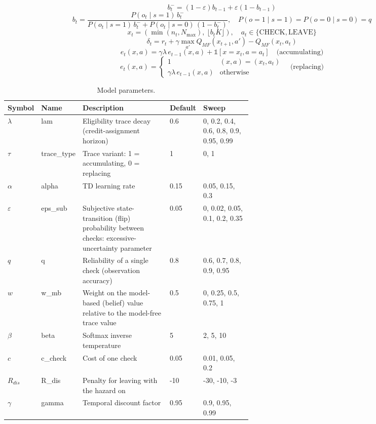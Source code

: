 \documentclass[11pt,a4paper]{article}
\begin{document}
\begin{equation}\label{eq:1}
b_t^{-} = (1-\varepsilon) b_{t-1} + \varepsilon (1 - b_{t-1})
\end{equation}
\begin{equation}\label{eq:2}
b_t = \frac{P(o_t \mid s=1)\, b_t^{-}}{P(o_t \mid s=1)\, b_t^{-} + P(o_t \mid s=0)\,(1-b_t^{-})}, \quad P(o=1 \mid s=1) = P(o=0 \mid s=0) = q
\end{equation}
\begin{equation}\label{eq:3}
x_t = (\min(n_t, N_{\max}),\ \lfloor b_t K \rfloor), \quad a_t \in \{\mathrm{CHECK}, \mathrm{LEAVE}\}
\end{equation}
\begin{equation}\label{eq:4}
\delta_t = r_t + \gamma \max_{a'} Q_{MF}(x_{t+1}, a') - Q_{MF}(x_t, a_t)
\end{equation}
\begin{equation}\label{eq:5}
e_t(x,a) = \gamma \lambda\, e_{t-1}(x,a) + \mathbb{1}[x = x_t, a = a_t] \quad \text{(accumulating)}
\end{equation}
\begin{equation}\label{eq:6}
e_t(x,a) = \begin{cases} 1 & (x,a) = (x_t,a_t) \\ \gamma \lambda\, e_{t-1}(x,a) & \text{otherwise} \end{cases} \quad \text{(replacing)}
\end{equation}
\begin{table}[ht]
\centering\small
\caption{Model parameters.}\label{tab:params}
\begin{tabular}{l l p{0.36\linewidth} l p{0.2\linewidth}}
\toprule
Symbol & Name & Description & Default & Sweep\\
\midrule
$\lambda$ & lam & Eligibility trace decay (credit-assignment horizon) & 0.6 & 0, 0.2, 0.4, 0.6, 0.8, 0.9, 0.95, 0.99\\
$\tau$ & trace\_type & Trace variant: 1 = accumulating, 0 = replacing & 1 & 0, 1\\
$\alpha$ & alpha & TD learning rate & 0.15 & 0.05, 0.15, 0.3\\
$\varepsilon$ & eps\_sub & Subjective state-transition (flip) probability between checks: excessive-uncertainty parameter & 0.05 & 0, 0.02, 0.05, 0.1, 0.2, 0.35\\
$q$ & q & Reliability of a single check (observation accuracy) & 0.8 & 0.6, 0.7, 0.8, 0.9, 0.95\\
$w$ & w\_mb & Weight on the model-based (belief) value relative to the model-free trace value & 0.5 & 0, 0.25, 0.5, 0.75, 1\\
$\beta$ & beta & Softmax inverse temperature & 5 & 2, 5, 10\\
$c$ & c\_check & Cost of one check & 0.05 & 0.01, 0.05, 0.2\\
$R_{dis}$ & R\_dis & Penalty for leaving with the hazard on & -10 & -30, -10, -3\\
$\gamma$ & gamma & Temporal discount factor & 0.95 & 0.9, 0.95, 0.99\\
\bottomrule
\end{tabular}
\end{table}
\end{document}
